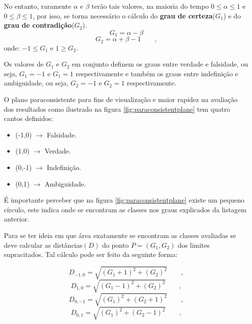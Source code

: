 \documentclass[a4paper,12pt,openright,oneside]{book}
\newenvironment{myenv}[1]
  {\begin{spacing}{#1}}
  {\end{spacing}}
\begin{document}
\begin{myenv}{1.5}
						\par No entanto, raramente $\alpha$ e $\beta$ terão tais valores, na maioria do tempo $0 \leqslant \alpha \leqslant 1$ e $0 \leqslant \beta \leqslant 1$, por isso, se torna necessário o cálculo do \textbf{grau de certeza}($G_1$) e do \textbf{grau de contradição}($G_2$).
						\begin{equation}
							G_1=\alpha-\beta 
						\end{equation}
						\begin{equation}
							G_2=\alpha+\beta-1 \qquad,
						\end{equation}
					onde: $-1 \leqslant G_1$ e  $1 \geqslant G_2$.

					\par Os valores de $G_1$ e $G_2$ em conjunto definem os graus entre verdade e falsidade, ou seja, $G_1=-1$ e $G_1=1$ respectivamente e também os graus entre indefinição e ambiguidade, ou seja, $G_2=-1$ e $G_2=1$ respectivamente.
					\par O plano paraconsistente para fins de visualização e maior rapidez na avaliação dos resultados como ilustrado na figura \ref{fig:paraconsistentplane} tem quatro cantos definidos:
					\begin{itemize}
						\item (-1,0) $\rightarrow$ Falsidade.
						\item (1,0) $\rightarrow$ Verdade.
						\item (0,-1) $\rightarrow$ Indefinição.
						\item (0,1) $\rightarrow$ Ambiguidade.
					\end{itemize}
					\par É importante perceber que na figura \ref{fig:paraconsistentplane} existe um pequeno círculo, este indica onde se encontram as classes nos graus explicados da listagem anterior.
					\par Para se ter ideia em que área exatamente se encontram as classes avaliadas se deve calcular as distâncias$(D)$ do ponto $P=(G_1,G_2)$ dos limites supracitados. Tal cálculo pode ser feito da seguinte forma:

					\begin{equation}
						D_{-1,0}=\sqrt{(G_1+1)^2+(G_2)^2}\qquad,
					\end{equation}
					\begin{equation}
						D_{1,0}=\sqrt{(G_1-1)^2+(G_2)^2}\qquad,
					\end{equation}
					\begin{equation}
						D_{0,-1}=\sqrt{(G_1)^2+(G_2+1)^2}\qquad,		
					\end{equation}
					\begin{equation}
						D_{0,1}=\sqrt{(G_1)^2+(G_2-1)^2}\qquad,
					\end{equation}		


\end{myenv}
\end{document}
